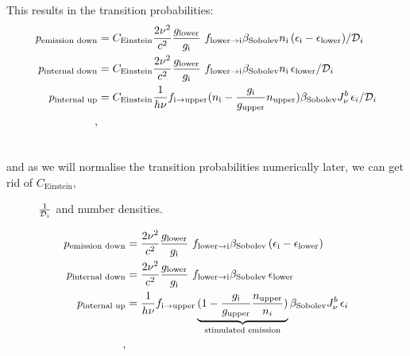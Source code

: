 \documentclass[letterpaper,10pt,english]{sphinxmanual}
\begin{document}
This results in the transition probabilities:
\begin{gather}
\begin{split}p_\textrm{emission down}&= C_\textrm{Einstein} \frac{2\nu^2}{c^2} \frac{g_\textrm{lower}}{g_\textrm{i}}~f_{\textrm{lower}\rightarrow\textrm{i}}
                                   \beta_\textrm{Sobolev}n_\textrm{i}\,(\epsilon_\textrm{i} - \epsilon_\textrm{lower}) / {\cal D}_{i}\\
p_\textrm{internal down}&= C_\textrm{Einstein} \frac{2\nu^2}{c^2} \frac{g_\textrm{lower}}{g_\textrm{i}}~f_{\textrm{lower}\rightarrow\textrm{i}}
                                   \beta_\textrm{Sobolev}n_\textrm{i}\,\epsilon_\textrm{lower}/{\cal D}_{i}\\
p_\textrm{internal up}&=C_\textrm{Einstein}\frac{1}{h\nu} f_{\textrm{i}\rightarrow\textrm{upper}}
                                    (n_\textrm{i}-\frac{g_\textrm{i}}{g_\textrm{upper}}n_\textrm{upper})
                                                \beta_\textrm{Sobolev} J_{\nu}^{b}\,\epsilon_{i}/{\cal D}_{i}\\,\end{split}\notag\\\begin{split}\end{split}\notag
\end{gather}\begin{description}
\item[{and as we will normalise the transition probabilities numerically later,  we can get rid of $C_\textrm{Einstein}$,}] \leavevmode
$\frac{1}{{\cal D}_i}$ and number densities.

\end{description}
\begin{gather}
\begin{split}p_\textrm{emission down}&= \frac{2\nu^2}{c^2} \frac{g_\textrm{lower}}{g_\textrm{i}}~f_{\textrm{lower}\rightarrow\textrm{i}}
                                   \beta_\textrm{Sobolev}\,(\epsilon_\textrm{i} - \epsilon_\textrm{lower})\\
p_\textrm{internal down}&=  \frac{2\nu^2}{c^2} \frac{g_\textrm{lower}}{g_\textrm{i}}~f_{\textrm{lower}\rightarrow\textrm{i}}
                                   \beta_\textrm{Sobolev}\,\epsilon_\textrm{lower}\\
p_\textrm{internal up}&=\frac{1}{h\nu} f_{\textrm{i}\rightarrow\textrm{upper}}
                                    \underbrace{(1-\frac{g_\textrm{i}}{g_\textrm{upper}}\frac{n_\textrm{upper}}{n_i})}
                                    _\textrm{stimulated emission}
                                                \beta_\textrm{Sobolev} J_{\nu}^{b}\,\epsilon_{i}\\,\end{split}\notag\\\begin{split}\end{split}\notag
\end{gather}
\end{document}
